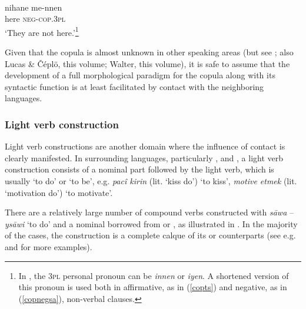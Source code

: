 \documentclass[output=paper]{langsci/langscibook}
\begin{document}
\begin{exe}
\ex\label{copnegsa}  \\
\gll nihane me-nnen	\\
here 	\textsc{neg-cop.3pl} \\
        \glt `They are not here.'\footnote{In  , the 3\textsc{pl} personal pronoun can be \textit{innen} or \textit{iyen}. A shortened version of this pronoun is used both in affirmative, as in (\ref{copts}) and negative, as in (\ref{copnegsa}), non-verbal clauses. }
\end{exe}

\noindent Given that the {copula} is almost unknown in other  speaking areas (but see \citealt{Blanc1964}; also Lucas \& Čéplö, this volume; Walter, this volume), it is safe to assume that the development of a full morphological paradigm for the {copula} along with its syntactic function is at least facilitated by contact with the neighboring languages.


\subsubsection{Light verb construction}


Light verb constructions are another domain where the influence of contact is clearly manifested. In surrounding languages, particularly ,  and , a {light verb} construction consists of a nominal part followed by the {light verb}, which is usually `to do' or `to be', e.g.  \textit{pacî kirin} (lit. `kiss do') `to kiss',  \textit{motive etmek} (lit. `motivation do') `to motivate’.

There are a relatively large number of compound verbs constructed with  \textit{s\={a}wa} – \textit{ys\={a}wi} `to do' and a nominal borrowed from  or , as illustrated in . In the majority of the cases, the construction is a complete {calque} of its  or  counterparts (see e.g. \citealt{Versteegh1997,Lahdo2009,Grigore2007article,Talay2007,Jastrow2011anatolian,Akkus2016,Akkus2017,AkkusBenmamoun2018} and \citealt{Bituna2016} for more examples).
\end{document}
